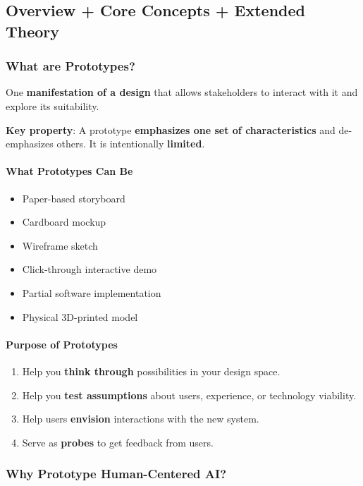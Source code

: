 \subsection{Overview + Core Concepts + Extended Theory}

\subsubsection*{What are Prototypes?}

\begin{defbox}[Prototype]
One \textbf{manifestation of a design} that allows stakeholders to interact with it and explore its suitability.

\textbf{Key property}: A prototype \textbf{emphasizes one set of characteristics} and de-emphasizes others. It is intentionally \textbf{limited}.
\end{defbox}

\paragraph*{What Prototypes Can Be}
\begin{itemize}
  \item Paper-based storyboard
  \item Cardboard mockup
  \item Wireframe sketch
  \item Click-through interactive demo
  \item Partial software implementation
  \item Physical 3D-printed model
\end{itemize}

\paragraph*{Purpose of Prototypes}
\begin{enumerate}
  \item Help you \textbf{think through} possibilities in your design space.
  \item Help you \textbf{test assumptions} about users, experience, or technology viability.
  \item Help users \textbf{envision} interactions with the new system.
  \item Serve as \textbf{probes} to get feedback from users.
\end{enumerate}

\subsubsection*{Why Prototype Human-Centered AI?}

